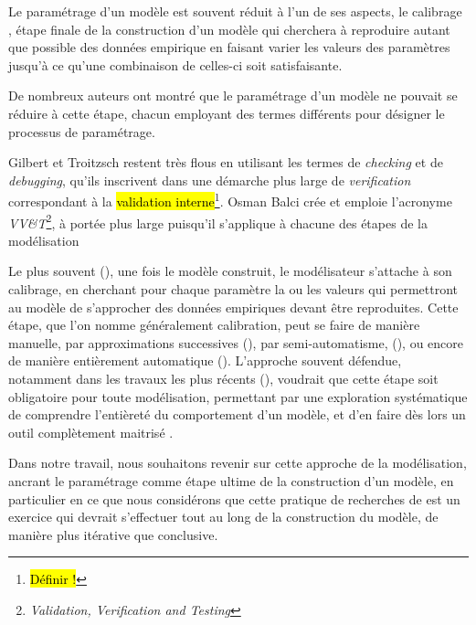 Le paramétrage d'un modèle est souvent réduit à l'un de ses aspects, le \og calibrage \fg, étape finale de la construction d'un modèle qui cherchera à reproduire autant que possible des données empirique en faisant varier les valeurs des paramètres jusqu'à ce qu'une combinaison de celles-ci soit satisfaisante.

De nombreux auteurs ont montré que le paramétrage d'un modèle ne pouvait se réduire à cette étape, chacun employant des termes différents pour désigner le processus de paramétrage.

Gilbert et Troitzsch \autocite{gilbert_simulation_2005} restent très flous en utilisant les termes de \textit{checking} et de \textit{debugging}, qu'ils inscrivent dans une démarche plus large de \textit{verification} correspondant à la \hl{validation interne}\footnote{\hl{Définir !}}.
Osman Balci \autocite{balci_validation_1994} crée et emploie l'acronyme \og \textit{VV\&T}\fg{}\footnote{\textit{Validation, Verification and Testing}}, à portée plus large puisqu'il s'applique à chacune des étapes de la modélisation

Le plus souvent (), une fois le modèle construit, le modélisateur s'attache à son \og calibrage\fg{}, en cherchant pour chaque paramètre la ou les valeurs qui permettront au modèle de s'approcher des données empiriques devant être reproduites.
Cette étape, que l'on nomme généralement calibration, peut se faire de manière manuelle, par approximations successives (), par semi-automatisme,  (), ou encore de manière entièrement automatique ().
L'approche souvent défendue, notamment dans les travaux les plus récents (), voudrait que cette étape soit obligatoire pour toute modélisation, permettant par une exploration systématique de comprendre l'entièreté du comportement d'un modèle, et d'en faire dès lors un outil complètement maitrisé .

Dans notre travail, nous souhaitons revenir sur cette approche de la modélisation, ancrant le paramétrage comme étape ultime de la construction d'un modèle, en particulier en ce que nous considérons que cette pratique de recherches de  est un exercice qui devrait s'effectuer tout au long de la construction du modèle, de manière plus itérative que conclusive.


